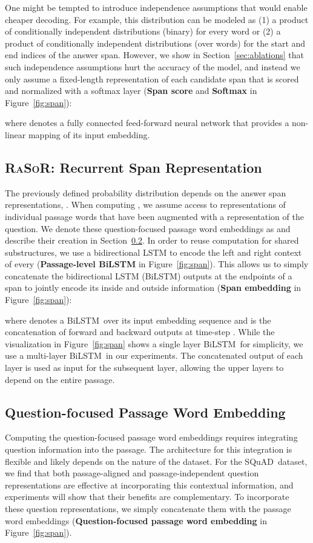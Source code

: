 \documentclass{article} \usepackage{iclr2017_conference,times}
\newcommand{\bilstm}{BiLSTM}
\newcommand{\squad}{{\sc SQuAD}}
\newcommand{\ourmodel}{\textsc{RaSoR}}
\begin{document}
One might be tempted to introduce independence assumptions that would enable cheaper decoding.
For example, this distribution can be modeled as (1) a product of conditionally independent distributions (binary) for every word or (2) a product of conditionally independent distributions (over words) for the start and end indices of the answer span.
However, we show in Section~\ref{sec:ablations} that such independence assumptions hurt the accuracy of the model, and instead we only assume a fixed-length representation  of each candidate span that is scored and normalized with a softmax layer (\textbf{Span score} and \textbf{Softmax} in Figure~\ref{fig:span}):

where  denotes a fully connected feed-forward neural network that provides a non-linear mapping of its input embedding.

\subsection{\ourmodel: Recurrent Span Representation}
The previously defined probability distribution depends on the answer span representations, .
When computing , we assume access to representations of individual passage words that have been augmented with a representation of the question.
We denote these question-focused passage word embeddings as  and describe their creation in Section~\ref{sec:pstar}.
In order to reuse computation for shared substructures, we use a bidirectional LSTM \citep{lstm} to encode the left and right context of every  (\textbf{Passage-level \bilstm} in Figure~\ref{fig:span}).
This allows us to simply concatenate the bidirectional LSTM (\bilstm) outputs at the endpoints of a span to jointly encode its inside and outside information (\textbf{Span embedding} in Figure~\ref{fig:span}):

where  denotes a \bilstm~over its input embedding sequence and  is the concatenation of forward and backward outputs at time-step . While the visualization in Figure~\ref{fig:span} shows a single layer \bilstm~for simplicity, we use a multi-layer \bilstm~in our experiments. The concatenated output of each layer is used as input for the subsequent layer, allowing the upper layers to depend on the entire passage.

\subsection{Question-focused Passage Word Embedding}
\label{sec:pstar}
Computing the question-focused passage word embeddings  requires integrating question information into the passage.
The architecture for this integration is flexible and likely depends on the nature of the dataset.
For the \squad~dataset, we find that both passage-aligned and passage-independent question representations are effective at incorporating this contextual information, and experiments will show that their benefits are complementary.
To incorporate these question representations, we simply concatenate them with the passage word embeddings (\textbf{Question-focused passage word embedding} in Figure~\ref{fig:span}).
\end{document}
